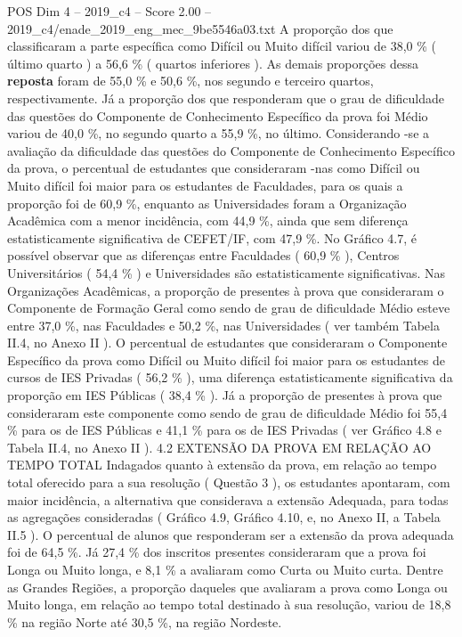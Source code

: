 \begin{textsample}{POS Dim 4 – 2019\_c4 – Score 2.00 – 2019\_c4/enade\_2019\_eng\_mec\_9be5546a03.txt}
A proporção dos que classificaram a parte específica como Difícil ou Muito difícil variou de 38,0 \% ( último quarto ) a 56,6 \% ( quartos inferiores ).
As demais proporções dessa \textbf{reposta} foram de 55,0 \% e 50,6 \%, nos segundo e terceiro quartos, respectivamente.
Já a proporção dos que responderam que o grau de dificuldade das questões do Componente de Conhecimento Específico da prova foi Médio variou de 40,0 \%, no segundo quarto a 55,9 \%, no último.
Considerando -se a avaliação da dificuldade das questões do Componente de Conhecimento Específico da prova, o percentual de estudantes que consideraram -nas como Difícil ou Muito difícil foi maior para os estudantes de Faculdades, para os quais a proporção foi de 60,9 \%, enquanto as Universidades foram a Organização Acadêmica com a menor incidência, com 44,9 \%, ainda que sem diferença estatisticamente significativa de CEFET/IF, com 47,9 \%.
No Gráfico 4.7, é possível observar que as diferenças entre Faculdades ( 60,9 \% ), Centros Universitários ( 54,4 \% ) e Universidades são estatisticamente significativas.
Nas Organizações Acadêmicas, a proporção de presentes à prova que consideraram o Componente de Formação Geral como sendo de grau de dificuldade Médio esteve entre 37,0 \%, nas Faculdades e 50,2 \%, nas Universidades ( ver também Tabela II.4, no Anexo II ).
O percentual de estudantes que consideraram o Componente Específico da prova como Difícil ou Muito difícil foi maior para os estudantes de cursos de IES Privadas ( 56,2 \% ), uma diferença estatisticamente significativa da proporção em IES Públicas ( 38,4 \% ).
Já a proporção de presentes à prova que consideraram este componente como sendo de grau de dificuldade Médio foi 55,4 \% para os de IES Públicas e 41,1 \% para os de IES Privadas ( ver Gráfico 4.8 e Tabela II.4, no Anexo II ). 4.2 EXTENSÃO DA PROVA EM RELAÇÃO AO TEMPO TOTAL Indagados quanto à extensão da prova, em relação ao tempo total oferecido para a sua resolução ( Questão 3 ), os estudantes apontaram, com maior incidência, a alternativa que considerava a extensão Adequada, para todas as agregações consideradas ( Gráfico 4.9, Gráfico 4.10, e, no Anexo II, a Tabela II.5 ).
O percentual de alunos que responderam ser a extensão da prova adequada foi de 64,5 \%.
Já 27,4 \% dos inscritos presentes consideraram que a prova foi Longa ou Muito longa, e 8,1 \% a avaliaram como Curta ou Muito curta.
Dentre as Grandes Regiões, a proporção daqueles que avaliaram a prova como Longa ou Muito longa, em relação ao tempo total destinado à sua resolução, variou de 18,8 \% na região Norte até 30,5 \%, na região Nordeste.

\end{textsample}
